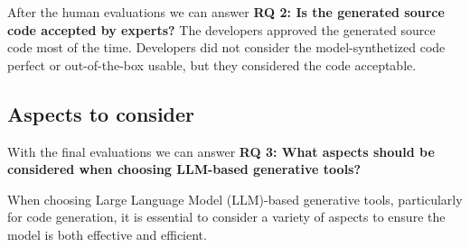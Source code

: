 After the human evaluations we can answer
\textbf{RQ 2: Is the generated source code accepted by experts?}
The developers approved the generated source code most of the time.
Developers did not consider the model-synthetized code perfect or out-of-the-box usable, but they considered the code acceptable.

\subsection{Aspects to consider}
With the final evaluations we can answer
\textbf{RQ 3: What aspects should be considered when choosing LLM-based generative tools?}

When choosing Large Language Model (LLM)-based generative tools, particularly for code generation, it is essential to consider a variety of aspects to ensure the model is both effective and efficient.
